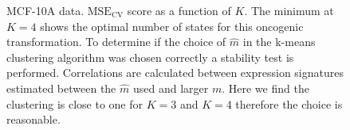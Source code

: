 \begin{figure}
  \centering
    \caption{MCF-10A data.  $\mathrm{MSE_{CV}}$ score as a function of $K$. The minimum at $K = 4$ shows the optimal number of states for this oncogenic transformation.  To determine if the choice of $\hat{m}$ in the k-means clustering algorithm was chosen correctly a stability test is performed. Correlations are calculated between expression signatures estimated between the $\hat{m}$ used and larger $m$. Here we find the clustering is close to one for $K=3$ and $K=4$ therefore the choice is reasonable.}
  \label{fig:data-m-k}
\end{figure}

